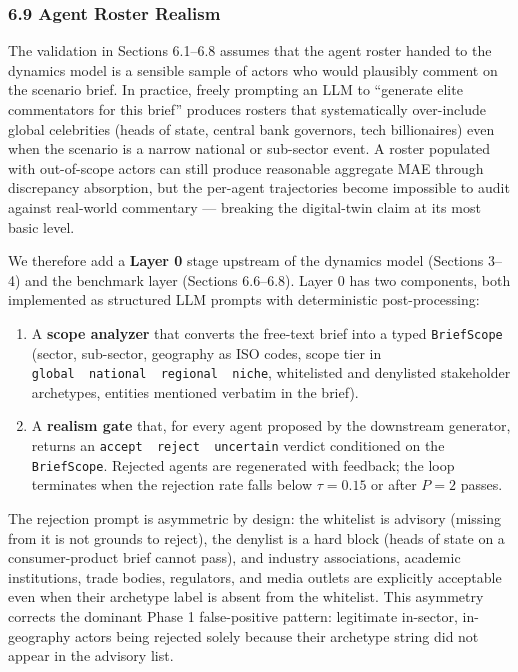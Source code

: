 \documentclass[
]{article}
\providecommand{\tightlist}{%
  \setlength{\itemsep}{0pt}\setlength{\parskip}{0pt}}
\begin{document}
\subsubsection{6.9 Agent Roster Realism}\label{agent-roster-realism}

The validation in Sections 6.1--6.8 assumes that the agent roster handed
to the dynamics model is a sensible sample of actors who would plausibly
comment on the scenario brief. In practice, freely prompting an LLM to
``generate elite commentators for this brief'' produces rosters that
systematically over-include global celebrities (heads of state, central
bank governors, tech billionaires) even when the scenario is a narrow
national or sub-sector event. A roster populated with out-of-scope
actors can still produce reasonable aggregate MAE through discrepancy
absorption, but the per-agent trajectories become impossible to audit
against real-world commentary --- breaking the digital-twin claim at its
most basic level.

We therefore add a \textbf{Layer 0} stage upstream of the dynamics model
(Sections 3--4) and the benchmark layer (Sections 6.6--6.8). Layer 0 has
two components, both implemented as structured LLM prompts with
deterministic post-processing:

\begin{enumerate}
\def\labelenumi{\arabic{enumi}.}
\tightlist
\item
  A \textbf{scope analyzer} that converts the free-text brief into a
  typed \texttt{BriefScope} (sector, sub-sector, geography as ISO codes,
  scope tier in
  \texttt{global\ \textbar{}\ national\ \textbar{}\ regional\ \textbar{}\ niche},
  whitelisted and denylisted stakeholder archetypes, entities mentioned
  verbatim in the brief).
\item
  A \textbf{realism gate} that, for every agent proposed by the
  downstream generator, returns an
  \texttt{accept\ \textbar{}\ reject\ \textbar{}\ uncertain} verdict
  conditioned on the \texttt{BriefScope}. Rejected agents are
  regenerated with feedback; the loop terminates when the rejection rate
  falls below \(\tau = 0.15\) or after \(P = 2\) passes.
\end{enumerate}

The rejection prompt is asymmetric by design: the whitelist is advisory
(missing from it is not grounds to reject), the denylist is a hard block
(heads of state on a consumer-product brief cannot pass), and industry
associations, academic institutions, trade bodies, regulators, and media
outlets are explicitly acceptable even when their archetype label is
absent from the whitelist. This asymmetry corrects the dominant Phase 1
false-positive pattern: legitimate in-sector, in-geography actors being
rejected solely because their archetype string did not appear in the
advisory list.
\end{document}
